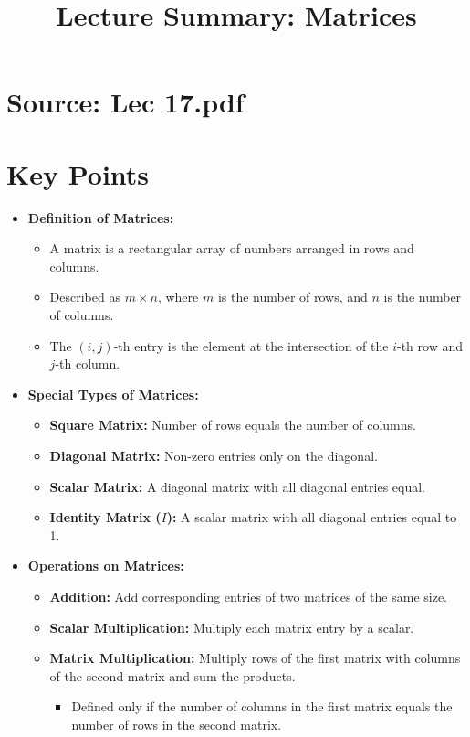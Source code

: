 \documentclass{article}
\title{Lecture Summary: Matrices}
\author{}
\date{}
\begin{document}
\maketitle

\section*{Source: Lec 17.pdf}

\section*{Key Points}

\begin{itemize}
  \item \textbf{Definition of Matrices:}
    \begin{itemize}
      \item A matrix is a rectangular array of numbers arranged in rows and columns.
      \item Described as $m \times n$, where $m$ is the number of rows, and $n$ is the number of columns.
      \item The $(i, j)$-th entry is the element at the intersection of the $i$-th row and $j$-th column.
    \end{itemize}

  \item \textbf{Special Types of Matrices:}
    \begin{itemize}
      \item \textbf{Square Matrix:} Number of rows equals the number of columns.
      \item \textbf{Diagonal Matrix:} Non-zero entries only on the diagonal.
      \item \textbf{Scalar Matrix:} A diagonal matrix with all diagonal entries equal.
      \item \textbf{Identity Matrix ($I$):} A scalar matrix with all diagonal entries equal to 1.
    \end{itemize}

  \item \textbf{Operations on Matrices:}
    \begin{itemize}
      \item \textbf{Addition:} Add corresponding entries of two matrices of the same size.
      \item \textbf{Scalar Multiplication:} Multiply each matrix entry by a scalar.
      \item \textbf{Matrix Multiplication:} Multiply rows of the first matrix with columns of the second matrix and sum the products.
        \begin{itemize}
          \item Defined only if the number of columns in the first matrix equals the number of rows in the second matrix.
        \end{itemize}
    \end{itemize}


\end{itemize}
\end{document}
